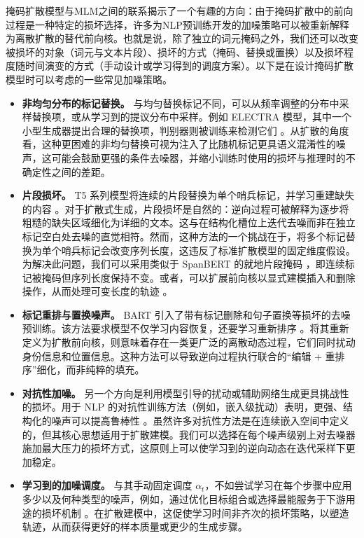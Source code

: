 \documentclass[UTF8,a4paper,zihao=-4,oneside,openany]{ctexbook}
\begin{document}
掩码扩散模型与MLM之间的联系揭示了一个有趣的方向：由于掩码扩散中的前向过程是一种特定的损坏选择，许多为NLP预训练开发的加噪策略可以被重新解释为离散扩散的替代前向核。也就是说，除了独立的词元掩码之外，我们还可以改变被损坏的对象（词元与文本片段）、损坏的方式（掩码、替换或置换）以及损坏程度随时间演变的方式（手动设计或学习得到的调度方案）。以下是在设计掩码扩散模型时可以考虑的一些常见加噪策略。

\begin{itemize}
\item \textbf{非均匀分布的标记替换。}
与均匀替换标记不同，可以从频率调整的分布中采样替换项，或从学习到的提议分布中采样。例如 ELECTRA 模型，其中一个小型生成器提出合理的替换项，判别器则被训练来检测它们 \citep{clark-etal:2019electra}。从扩散的角度看，这种更困难的非均匀替换可视为注入了比随机标记更具语义混淆性的噪声，这可能会鼓励更强的条件去噪器，并缩小训练时使用的损坏与推理时的不确定性之间的差距。
\item \textbf{片段损坏。}
T5 系列模型将连续的片段替换为单个哨兵标记，并学习重建缺失的内容 \citep{raffel-etal:2020exploring}。对于扩散式生成，片段损坏是自然的：逆向过程可被解释为逐步将粗糙的缺失区域细化为详细的文本。这与在结构化槽位上迭代去噪而非在独立标记空白处去噪的直觉相符。然而，这种方法的一个挑战在于，将多个标记替换为单个哨兵标记会改变序列长度，这违反了标准扩散模型的固定维度假设。为解决此问题，我们可以采用类似于 SpanBERT 的就地片段掩码 \citep{joshi-etal:2020spanbert}，即连续标记被掩码但序列长度保持不变。或者，可以扩展前向核以显式建模插入和删除操作，从而处理可变长度的轨迹 \citep{gu-etal:2019levenshtein,reid-etal:2022diffuser}。
\item \textbf{标记重排与置换噪声。}
BART 引入了带有标记删除和句子置换等损坏的去噪预训练。该方法要求模型不仅学习内容恢复，还要学习重新排序 \citep{lewis-etal:2020bart}。将其重新定义为扩散前向核，则意味着存在一类更广泛的离散动态过程，它们同时扰动身份信息和位置信息。这种方法可以导致逆向过程执行联合的“编辑 + 重排序”细化，而非纯粹的填充。
\item \textbf{对抗性加噪。}
另一个方向是利用模型引导的扰动或辅助网络生成更具挑战性的损坏。用于 NLP 的对抗性训练方法（例如，嵌入级扰动）表明，更强、结构化的噪声可以提高鲁棒性 \citep{zhu-etal:2020freelb}。虽然许多对抗性方法是在连续嵌入空间中定义的，但其核心思想适用于扩散建模。我们可以选择在每个噪声级别上对去噪器施加最大压力的损坏方式，这原则上可以使学习到的逆向动态在迭代采样下更加稳定。
\item \textbf{学习到的加噪调度。}
与其手动固定调度 $\alpha_t$，不如尝试学习在每个步骤中应用多少以及何种类型的噪声，例如，通过优化目标组合或选择最能服务于下游用途的损坏机制 \citep{tay-etal:2023ul2}。在扩散建模中，这促使学习时间非齐次的损坏策略，以塑造轨迹，从而获得更好的样本质量或更少的生成步骤。
\end{itemize}
\end{document}
